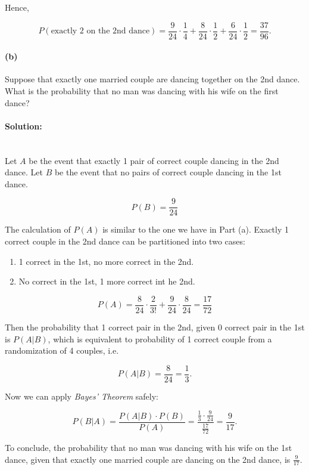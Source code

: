 \documentclass[a4paper, 11pt, twoside]{article}
\begin{document}
Hence,

\[P(\text{exactly 2 on the 2nd dance})=\frac{9}{24}\cdot\frac14+\frac{8}{24}\cdot\frac12+\frac{6}{24}\cdot\frac12=\frac{37}{96}.\]

\paragraph{(b)} Suppose that exactly one married couple are dancing together on the 2nd dance. What is the probability that no man was dancing with his wife on the first dance?\\

\paragraph{Solution:}\ \\

Let $A$ be the event that exactly 1 pair of correct couple dancing in the 2nd dance.
Let $B$ be the event that no pairs of correct couple dancing in the 1st dance.

\[P(B) = \frac{9}{24}\]

The calculation of $P(A)$ is similar to the one we have in Part (a). Exactly 1 correct couple in the 2nd dance can be partitioned into two cases:

\begin{enumerate}
	\item 1 correct in the 1st, no more correct in the 2nd.
	\item No correct in the 1st, 1 more correct int he 2nd.
\end{enumerate}

\[P(A)=\frac{8}{24}\cdot\frac{2}{3!}+\frac{9}{24}\cdot\frac{8}{24}=\frac{17}{72}\]

Then the probability that 1 correct pair in the 2nd, given 0 correct pair in the 1st is $P(A|B)$, which is equivalent to probability of 1 correct couple from a randomization of 4 couples, i.e.

\[P(A|B)=\frac{8}{24}=\frac13.\]

Now we can apply \textit{Bayes' Theorem} safely:

\[P(B|A)=\frac{P(A|B)\cdot P(B)}{P(A)}=\frac{\frac13\cdot\frac9{24}}{\frac{17}{72}}=\frac{9}{17}.\]

To conclude, the probability that no man was dancing with his wife on the 1st dance, given that exactly one married couple are dancing on the 2nd dance, is $\frac{9}{17}.$\\
\end{document}
